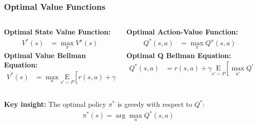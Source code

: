 \begin{frame}
    \frametitle{Optimal Value Functions}
    
    \begin{columns}[T]
        \begin{column}{0.5\textwidth}
            \textbf{Optimal State Value Function:}
            \begin{align*}
                V^{*}(s) &= \underset{\pi}{\max} V^{\pi}(s)
            \end{align*}
            \vspace{0.1cm}
            \textbf{Optimal Value Bellman Equation:}
            \begin{align*}
                V^{*}(s) &= \max_a \underset{s'\sim P}{\mathrm{E}} \left[ r(s,a) + \gamma V^{*}(s') \right]
            \end{align*}
        \end{column}
        
        \begin{column}{0.5\textwidth}
            \textbf{Optimal Action-Value Function:}
            \begin{align*}
                Q^{*}(s,a) &= \underset{\pi}{\max} Q^{\pi}(s,a)
            \end{align*}
            \vspace{0.1cm}
            \textbf{Optimal Q Bellman Equation:}
            \begin{align*}
                Q^{*}(s,a) &= r(s,a) + \gamma \underset{s'\sim P}{\mathrm{E}} \left[ \max_{a'} Q^{*}(s',a') \right]
            \end{align*}
        \end{column}
    \end{columns}
    
    \vspace{0.4cm}
    \textbf{Key insight:} The optimal policy $\pi^*$ is greedy with respect to $Q^*$:
    \begin{align*}
        \pi^*(s) = \arg\max_a Q^*(s,a)
    \end{align*}
\end{frame}

